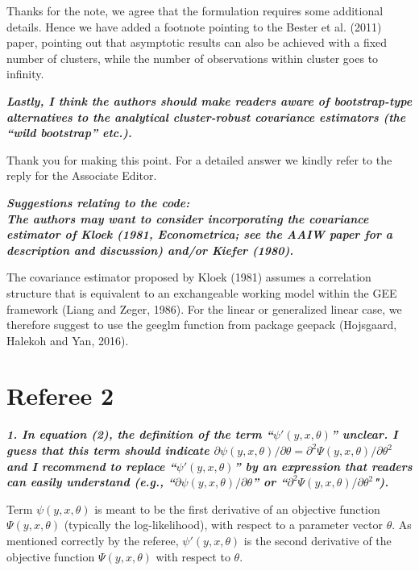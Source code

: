 \documentclass[10pt,a4paper]{article}
\begin{document}
\medskip

Thanks for the note, we agree that the formulation requires some additional details.
Hence we have added a footnote pointing to the Bester et al. (2011) paper, pointing out that asymptotic results can also be achieved with a fixed number of clusters, while the number of observations within cluster goes to infinity.

\medskip

\textbf{\textit{Lastly, I think the authors should make readers aware of bootstrap-type alternatives to the analytical cluster-robust covariance estimators (the ``wild bootstrap'' etc.).}}

\medskip

Thank you for making this point. For a detailed answer we kindly refer to the reply for the Associate Editor. 

\medskip

\textbf{\textit{Suggestions relating to the code:
\\
The authors may want to consider incorporating the  covariance estimator of Kloek (1981, Econometrica; see the AAIW paper for a description and discussion) and/or Kiefer (1980).}}

\medskip

The covariance estimator proposed by Kloek (1981) assumes a correlation structure that is equivalent to an exchangeable working model within the GEE framework (Liang and Zeger, 1986).
For the linear or generalized linear case, we therefore suggest to use the geeglm function from package geepack (Hojsgaard, Halekoh and Yan, 2016).

\section*{Referee 2}

\textbf{\textit{1. In equation (2), the definition of the term ``$\psi'(y, x, \theta)$'' unclear.
I guess that this term should indicate $\partial \psi(y, x, \theta)/\partial\theta = \partial^2\Psi(y, x, \theta)/\partial\theta^2$ and I recommend to replace ``$\psi'(y, x, \theta)$''
by an expression that readers can easily understand
(e.g., ``$\partial \psi(y, x, \theta)/\partial\theta$'' or ``$\partial^2\Psi(y, x, \theta)/\partial\theta^2$").}}

\medskip

Term $\psi(y, x, \theta)$ is meant to be the first derivative of an objective function $\Psi(y, x, \theta)$ (typically the log-likelihood), with respect to a parameter vector $\theta$. As mentioned correctly by the referee, $\psi'(y, x, \theta)$ is the second derivative of the objective function $\Psi(y, x, \theta)$ with respect to $\theta$.
\end{document}
